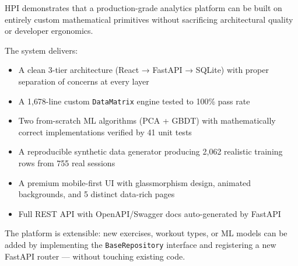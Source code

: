 \documentclass[12pt,a4paper]{report}
\begin{document}
HPI demonstrates that a production-grade analytics platform can be built
on entirely custom mathematical primitives without sacrificing architectural
quality or developer ergonomics.

The system delivers:
\begin{itemize}
  \item A clean 3-tier architecture (React → FastAPI → SQLite) with proper
        separation of concerns at every layer
  \item A 1{,}678-line custom \texttt{DataMatrix} engine tested to 100\% pass rate
  \item Two from-scratch ML algorithms (PCA + GBDT) with mathematically correct
        implementations verified by 41 unit tests
  \item A reproducible synthetic data generator producing 2{,}062 realistic
        training rows from 755 real sessions
  \item A premium mobile-first UI with glassmorphism design, animated backgrounds,
        and 5 distinct data-rich pages
  \item Full REST API with OpenAPI/Swagger docs auto-generated by FastAPI
\end{itemize}

The platform is extensible: new exercises, workout types, or ML models can be
added by implementing the \texttt{BaseRepository} interface and registering a
new FastAPI router — without touching existing code.
\end{document}
